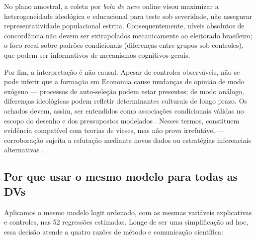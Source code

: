 No plano amostral, a coleta por \textit{bola de neve} online visou maximizar a heterogeneidade ideológica e educacional para teste sob severidade, não assegurar representatividade populacional estrita. Consequentemente, níveis absolutos de concordância não devem ser extrapolados mecanicamente ao eleitorado brasileiro; o foco recai sobre padrões condicionais (diferenças entre grupos sob controles), que podem ser informativos de mecanismos cognitivos gerais. 

Por fim, a interpretação é não causal. Apesar de controles observáveis, não se pode inferir que a formação em Economia cause mudanças de opinião de modo exógeno — processos de auto-seleção podem estar presentes; de modo análogo, diferenças ideológicas podem refletir determinantes culturais de longo prazo. Os achados devem, assim, ser entendidos como associações condicionais válidas no escopo do desenho e dos pressupostos modelados \cite{hausman2008}. Nesses termos, constituem evidência compatível com teorias de vieses, mas não prova irrefutável — corroboração sujeita a refutação mediante novos dados ou estratégias inferenciais alternativas \cite{popperlogic}.

\subsection{Por que usar o mesmo modelo para todas as DVs}\label{sec:modelo-unico}
Aplicamos o mesmo modelo logit ordenado, com as mesmas variáveis explicativas e controles, nas 52 regressões estimadas. Longe de ser uma simplificação ad hoc, essa decisão atende a quatro razões de método e comunicação científica:

